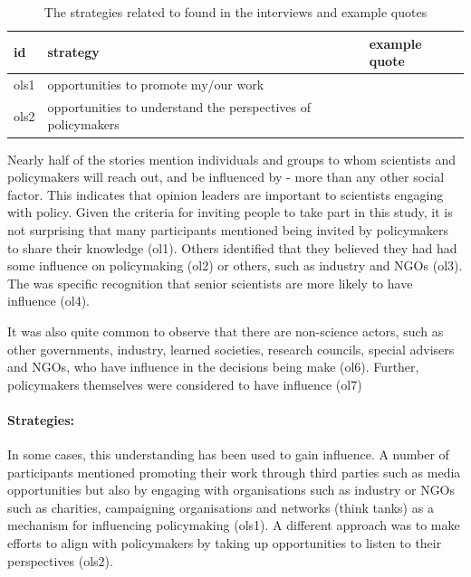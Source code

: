 \begin{table}[!ht]
\footnotesize
\caption{The strategies related to \ismso{} found in the interviews and example quotes}\label{tab:resopinionstrat}
\begin{tabular}{L{.06\linewidth}L{.3\linewidth}L{.64\linewidth}} \hline
\textbf{id} & \textbf{strategy} & \textbf{example quote} \\ \hline \hline
ols1 & opportunities to promote my/our work &   \\[5mm]
ols2 &  opportunities to understand the perspectives of policymakers &  \\[5mm] \hline
\end{tabular}
\end{table}

Nearly half of the stories mention individuals and groups to whom scientists and policymakers will reach out, and be influenced by - more than any other social factor. This indicates that opinion leaders are important to scientists engaging with policy. Given the criteria for inviting people to take part in this study, it is not surprising that many participants mentioned being invited by policymakers to share their knowledge (ol1). Others identified that they believed they had had some influence on policymaking (ol2) or others, such as industry and NGOs (ol3). The was specific recognition that senior scientists are more likely to have influence (ol4).  

It was also quite common to observe that there are non-science actors, such as other governments, industry, learned societies, research councils, special advisers and NGOs, who have influence in the decisions being make (ol6). Further, policymakers themselves were considered to have influence (ol7)

\paragraph{Strategies:}
In some cases, this understanding has been used to gain influence. A number of participants mentioned promoting their work through third parties such as media opportunities but also by engaging with organisations such as industry or NGOs such as charities, campaigning organisations and networks (think tanks) as a mechanism for influencing policymaking (ols1). A different approach was to make efforts to align with policymakers by taking up opportunities to listen to their perspectives (ols2).

